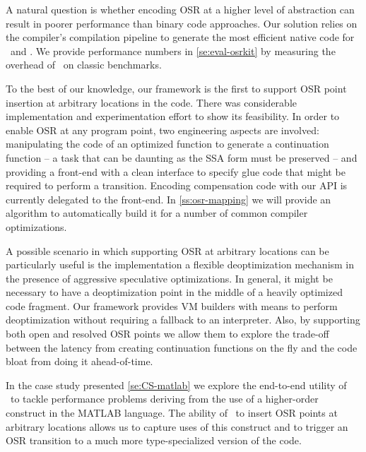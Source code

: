 \noindent A natural question is whether encoding OSR at a higher level of abstraction can result in poorer performance than binary code approaches. Our solution relies on the compiler's compilation pipeline to generate the most efficient native code for \fosrfrom\ and \fosrto. We provide performance numbers in \mysection\ref{se:eval-osrkit} by measuring the overhead of \osrkit\ on classic benchmarks.

To the best of our knowledge, our framework is the first to support OSR point insertion at arbitrary locations in the code. There was considerable implementation and experimentation effort to show its feasibility. In order to enable OSR at any program point, two engineering aspects are involved: manipulating the code of an optimized function to generate a continuation function -- a task that can be daunting as the SSA form must be preserved -- and providing a front-end with a clean interface to specify glue code that might be required to perform a transition. Encoding compensation code with our API is currently delegated to the front-end. In \mysection\ref{ss:osr-mapping} we will provide an algorithm to automatically build it for a number of common compiler optimizations.

A possible scenario in which supporting OSR at arbitrary locations can be particularly useful is the implementation a flexible deoptimization mechanism in the presence of aggressive speculative optimizations. In general, it might be necessary to have a deoptimization point in the middle of a heavily optimized code fragment. Our framework provides VM builders with means to perform deoptimization without requiring a fallback to an interpreter. Also, by supporting both open and resolved OSR points we allow them to explore the trade-off between the latency from creating continuation functions on the fly and the code bloat from doing it ahead-of-time.

In the case study presented \mysection\ref{se:CS-matlab} we explore the end-to-end utility of \osrkit\ to tackle performance problems deriving from the use of a higher-order construct in the MATLAB language. The ability of \osrkit\ to insert OSR points at arbitrary locations allows us to capture uses of this construct and to trigger an OSR transition to a much more type-specialized version of the code.


